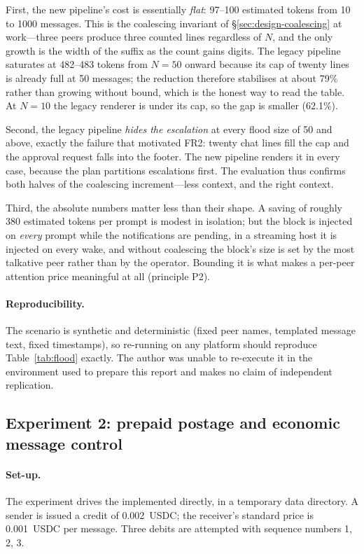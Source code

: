 First, the new pipeline's cost is essentially \emph{flat}: 97--100 estimated tokens from
10 to 1000 messages. This is the coalescing invariant of \S\ref{sec:design-coalescing} at
work---three peers produce three counted lines regardless of $N$, and the only growth is
the width of the  suffix as the count gains digits. The legacy pipeline
saturates at 482--483 tokens from $N=50$ onward because its cap of twenty lines is
already full at 50 messages; the reduction therefore stabilises at about 79\% rather than
growing without bound, which is the honest way to read the table. At $N=10$ the legacy
renderer is under its cap, so the gap is smaller (62.1\%).

Second, the legacy pipeline \emph{hides the escalation} at every flood size of 50 and
above, exactly the failure that motivated FR2: twenty chat lines fill the cap and the
approval request falls into the footer. The new pipeline renders it in every case,
because the plan partitions escalations first. The evaluation thus confirms both halves
of the coalescing increment---less context, and the right context.

Third, the absolute numbers matter less than their shape. A saving of roughly 380
estimated tokens per prompt is modest in isolation; but the block is injected on
\emph{every} prompt while the notifications are pending, in a streaming host it is
injected on every wake, and without coalescing the block's size is set by the most
talkative peer rather than by the operator. Bounding it is what makes a per-peer
attention price meaningful at all (principle P2).

\paragraph{Reproducibility.}
The scenario is synthetic and deterministic (fixed peer names, templated message text,
fixed timestamps), so re-running  on any
platform should reproduce Table~\ref{tab:flood} exactly. The author was unable to
re-execute it in the environment used to prepare this report and makes no claim of
independent replication.

\subsection{Experiment 2: prepaid postage and economic message control}
\label{sec:eval-postage}

\paragraph{Set-up.}
The experiment drives the implemented  directly, in a temporary
data directory. A sender is issued a credit of 0.002~USDC; the receiver's standard price is
0.001~USDC per message. Three debits are attempted with sequence numbers 1, 2, 3.

